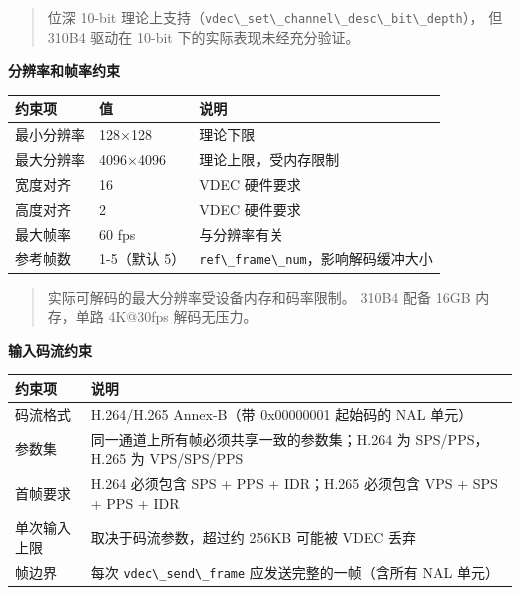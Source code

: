 \begin{quote}
位深 10-bit
理论上支持（\passthrough{\lstinline!vdec\_set\_channel\_desc\_bit\_depth!}），
但 310B4 驱动在 10-bit 下的实际表现未经充分验证。
\end{quote}

\textbf{分辨率和帧率约束}

\begin{longtable}[]{@{}lll@{}}
\toprule\noalign{}
约束项 & 值 & 说明 \\
\midrule\noalign{}
\endhead
\bottomrule\noalign{}
\endlastfoot
最小分辨率 & 128×128 & 理论下限 \\
最大分辨率 & 4096×4096 & 理论上限，受内存限制 \\
宽度对齐 & 16 & VDEC 硬件要求 \\
高度对齐 & 2 & VDEC 硬件要求 \\
最大帧率 & 60 fps & 与分辨率有关 \\
参考帧数 & 1-5（默认 5） &
\passthrough{\lstinline!ref\_frame\_num!}，影响解码缓冲大小 \\
\end{longtable}

\begin{quote}
实际可解码的最大分辨率受设备内存和码率限制。 310B4 配备 16GB 内存，单路
4K@30fps 解码无压力。
\end{quote}

\textbf{输入码流约束}

\begin{longtable}[]{@{}
  >{\raggedright\arraybackslash}p{}
  >{\raggedright\arraybackslash}p{}@{}}
\toprule\noalign{}
\begin{minipage}[b]{\linewidth}\raggedright
约束项
\end{minipage} & \begin{minipage}[b]{\linewidth}\raggedright
说明
\end{minipage} \\
\midrule\noalign{}
\endhead
\bottomrule\noalign{}
\endlastfoot
码流格式 & H.264/H.265 Annex-B（带 0x00000001 起始码的 NAL 单元） \\
参数集 & 同一通道上所有帧必须共享一致的参数集；H.264 为 SPS/PPS，H.265
为 VPS/SPS/PPS \\
首帧要求 & H.264 必须包含 SPS + PPS + IDR；H.265 必须包含 VPS + SPS +
PPS + IDR \\
单次输入上限 & 取决于码流参数，超过约 256KB 可能被 VDEC 丢弃 \\
帧边界 & 每次 \passthrough{\lstinline!vdec\_send\_frame!}
应发送完整的一帧（含所有 NAL 单元） \\
\end{longtable}

